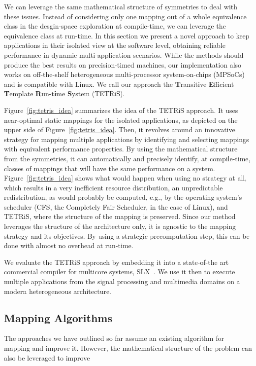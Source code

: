 \documentclass[sigplan,10pt]{acmart}
\begin{document}
We can leverage the same mathematical structure of symmetries to deal with these issues. Instead of considering only one mapping out of a whole equivalence class in the desgin-space exploration at compile-time, we can leverage the equivalence class at run-time.
In this section we present a novel approach to keep applications in their isolated view at the software level, obtaining reliable performance in dynamic multi-application scenarios.
While the methods should produce the best results on precision-timed machines, our implementation also works on off-the-shelf heterogeneous multi-processor system-on-chips (MPSoCs) and is compatible with Linux.
We call our approach the \textbf{T}ransitive \textbf{E}fficient \textbf{T}emplate \textbf{R}un-t\textbf{i}me \textbf{S}ystem (TETRiS).

Figure~\ref{fig:tetris_idea} summarizes the idea of the TETRiS approach. It uses near-optimal static mappings for the isolated applications, as depicted
on the upper side of Figure~\ref{fig:tetris_idea}. Then, it revolves around an innovative strategy for mapping multiple applications by 
identifying and selecting mappings with equivalent performance properties. By using the mathematical structure from the symmetries, it can automatically and precisely identify, at compile-time, classes of mappings that will have the same performance on a system.
Figure~\ref{fig:tetris_idea} shows what would happen when using no strategy at all, which results in a very
inefficient resource distribution, an unpredictable redistribution, as would probably be computed, e.g., by the operating system's scheduler (CFS, the Completely Fair Scheduler, in the case of Linux), and TETRiS, where the structure of the 
mapping is preserved. Since our method leverages the structure of the architecture only, it is agnostic to the mapping strategy and its objectives. By using a strategic precomputation step, this can be done with almost no overhead at run-time. 

We evaluate the TETRiS approach by embedding it into a state-of-the art commercial compiler for multicore systems, SLX~\cite{slx}.
We use it then to execute multiple applications from the signal processing and multimedia domains on a modern heterogeneous architecture.

\subsection{Mapping Algorithms}
The approaches we have outlined so far assume an existing algorithm for mapping and improve it. However, the mathematical structure of the problem can also be leveraged to improve 
\end{document}
